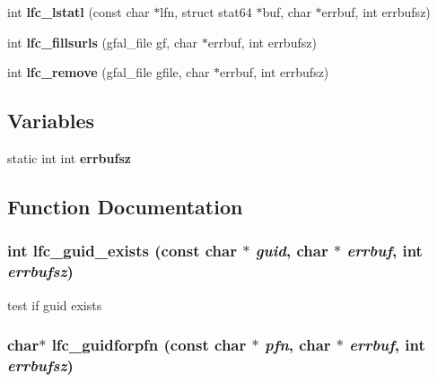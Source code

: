 \begin{CompactItemize}
\item 
int \textbf{lfc\_\-lstatl} (const char $\ast$lfn, struct stat64 $\ast$buf, char $\ast$errbuf, int errbufsz)\label{group__lfc__low__group_g498672f9d3482822d3da75e23903cfdb}

\item 
int \textbf{lfc\_\-fillsurls} (gfal\_\-file gf, char $\ast$errbuf, int errbufsz)\label{group__lfc__low__group_g0b34fbad9eb051aa476eec5bea9e7692}

\item 
int \textbf{lfc\_\-remove} (gfal\_\-file gfile, char $\ast$errbuf, int errbufsz)\label{group__lfc__low__group_g1f63e86121210390d7f0d448bdd4d44f}

\end{CompactItemize}
\subsection*{Variables}
\begin{CompactItemize}
\item 
static int int \textbf{errbufsz}\label{group__lfc__low__group_g51ff886d2f9a537a943f4db41528d563}

\end{CompactItemize}


\subsection{Function Documentation}
\subsubsection{\setlength{\rightskip}{0pt plus 5cm}int lfc\_\-guid\_\-exists (const char $\ast$ {\em guid}, char $\ast$ {\em errbuf}, int {\em errbufsz})}\label{group__lfc__low__group_g89af6526e8342c74f90fa2ee10cdc5fa}


test if guid exists 
\subsubsection{\setlength{\rightskip}{0pt plus 5cm}char$\ast$ lfc\_\-guidforpfn (const char $\ast$ {\em pfn}, char $\ast$ {\em errbuf}, int {\em errbufsz})}\label{group__lfc__low__group_g344113bab975bfeedfa4be33b2054745}


